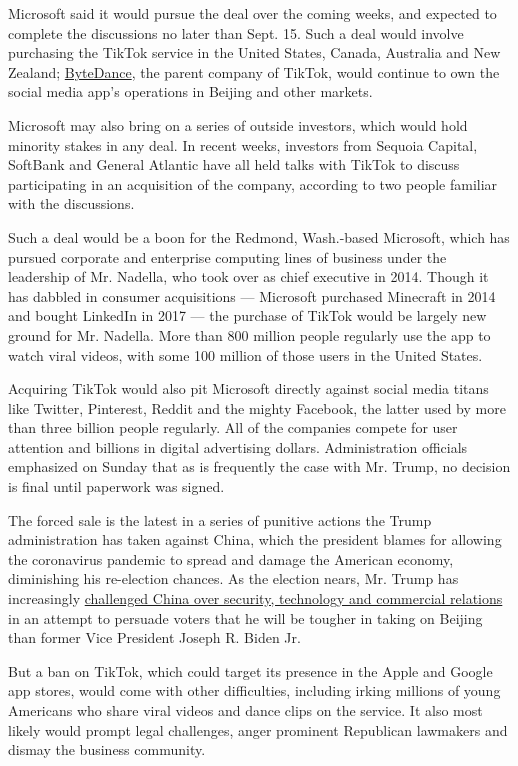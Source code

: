 Microsoft said it would pursue the deal over the coming weeks, and
expected to complete the discussions no later than Sept. 15. Such a deal
would involve purchasing the TikTok service in the United States,
Canada, Australia and New Zealand;
\href{https://www.nytimes.com/2020/08/03/technology/tiktok-trump-sale-microsoft.html}{ByteDance},
the parent company of TikTok, would continue to own the social media
app's operations in Beijing and other markets.

Microsoft may also bring on a series of outside investors, which would
hold minority stakes in any deal. In recent weeks, investors from
Sequoia Capital, SoftBank and General Atlantic have all held talks with
TikTok to discuss participating in an acquisition of the company,
according to two people familiar with the discussions.

Such a deal would be a boon for the Redmond, Wash.-based Microsoft,
which has pursued corporate and enterprise computing lines of business
under the leadership of Mr. Nadella, who took over as chief executive in
2014. Though it has dabbled in consumer acquisitions --- Microsoft
purchased Minecraft in 2014 and bought LinkedIn in 2017 --- the purchase
of TikTok would be largely new ground for Mr. Nadella. More than 800
million people regularly use the app to watch viral videos, with some
100 million of those users in the United States.

Acquiring TikTok would also pit Microsoft directly against social media
titans like Twitter, Pinterest, Reddit and the mighty Facebook, the
latter used by more than three billion people regularly. All of the
companies compete for user attention and billions in digital advertising
dollars. Administration officials emphasized on Sunday that as is
frequently the case with Mr. Trump, no decision is final until paperwork
was signed.

The forced sale is the latest in a series of punitive actions the Trump
administration has taken against China, which the president blames for
allowing the coronavirus pandemic to spread and damage the American
economy, diminishing his re-election chances. As the election nears, Mr.
Trump has increasingly
\href{https://www.nytimes.com/2020/07/25/world/asia/us-china-trump-xi.html}{challenged
China over security, technology and commercial relations} in an attempt
to persuade voters that he will be tougher in taking on Beijing than
former Vice President Joseph R. Biden Jr.

But a ban on TikTok, which could target its presence in the Apple and
Google app stores, would come with other difficulties, including irking
millions of young Americans who share viral videos and dance clips on
the service. It also most likely would prompt legal challenges, anger
prominent Republican lawmakers and dismay the business community.

